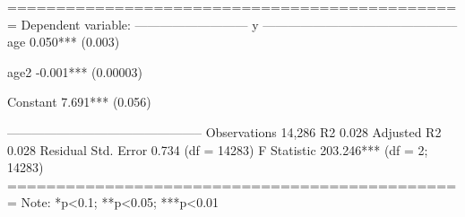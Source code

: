 
===============================================
                        Dependent variable:    
                    ---------------------------
                                 y             
-----------------------------------------------
age                          0.050***          
                              (0.003)          
                                               
age2                         -0.001***         
                             (0.00003)         
                                               
Constant                     7.691***          
                              (0.056)          
                                               
-----------------------------------------------
Observations                  14,286           
R2                             0.028           
Adjusted R2                    0.028           
Residual Std. Error     0.734 (df = 14283)     
F Statistic         203.246*** (df = 2; 14283) 
===============================================
Note:               *p<0.1; **p<0.05; ***p<0.01


